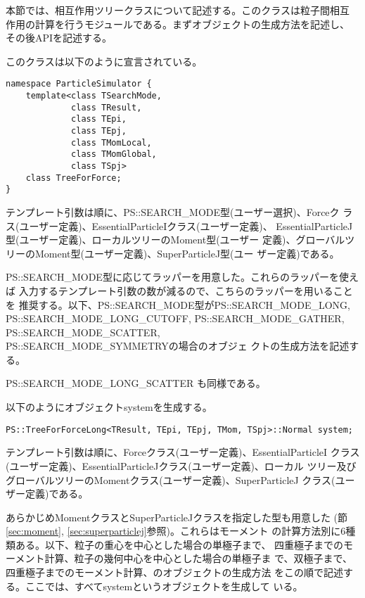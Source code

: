本節では、相互作用ツリークラスについて記述する。このクラスは粒子間相互
作用の計算を行うモジュールである。まずオブジェクトの生成方法を記述し、
その後APIを記述する。


このクラスは以下のように宣言されている。
\begin{lstlisting}[caption=TreeForForce0]
namespace ParticleSimulator {
    template<class TSearchMode,
             class TResult,
             class TEpi,
             class TEpj,
             class TMomLocal,
             class TMomGlobal,
             class TSpj>
    class TreeForForce;
}
\end{lstlisting}

テンプレート引数は順に、PS::SEARCH\_MODE型(ユーザー選択)、Forceク
ラス(ユーザー定義)、EssentialParticleIクラス(ユーザー定義)、
EssentialParticleJ型(ユーザー定義)、ローカルツリーのMoment型(ユーザー
定義)、グローバルツリーのMoment型(ユーザー定義)、SuperParticleJ型(ユー
ザー定義)である。

PS::SEARCH\_MODE型に応じてラッパーを用意した。これらのラッパーを使えば
入力するテンプレート引数の数が減るので、こちらのラッパーを用いることを
推奨する。以下、PS::SEARCH\_MODE型がPS::SEARCH\_MODE\_LONG,
PS::SEARCH\_MODE\_LONG\_CUTOFF, PS::SEARCH\_MODE\_GATHER,
PS::SEARCH\_MODE\_SCATTER, \\PS::SEARCH\_MODE\_SYMMETRYの場合のオブジェ
クトの生成方法を記述する。

\label{sec:module_treeforce_standard_search_mode_long}

PS::SEARCH\_MODE\_LONG\_SCATTER も同様である。

以下のようにオブジェクトsystemを生成する。
\begin{screen}
\begin{verbatim}
PS::TreeForForceLong<TResult, TEpi, TEpj, TMom, TSpj>::Normal system;
\end{verbatim}
\end{screen}
テンプレート引数は順に、Forceクラス(ユーザー定義)、EssentialParticleI
クラス(ユーザー定義)、EssentialParticleJクラス(ユーザー定義)、ローカル
ツリー及びグローバルツリーのMomentクラス(ユーザー定義)、SuperParticleJ
クラス(ユーザー定義)である。

あらかじめMomentクラスとSuperParticleJクラスを指定した型も用意した
(節\ref{sec:moment}, \ref{sec:superparticlej}参照)。これらはモーメント
の計算方法別に6種類ある。以下、粒子の重心を中心とした場合の単極子まで、
四重極子までのモーメント計算、粒子の幾何中心を中心とした場合の単極子ま
で、双極子まで、四重極子までのモーメント計算、のオブジェクトの生成方法
をこの順で記述する。ここでは、すべてsystemというオブジェクトを生成して
いる。

